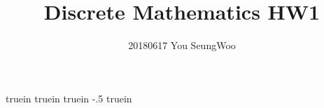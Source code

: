  truein 
 truein 
 truein 
\topmargin -.5 truein 
\textheight 8.5in
\setlength{\parindent}{10pt}
\hypersetup{
	colorlinks=true,
	linkcolor=red,
	filecolor=magenta,      
	urlcolor=cyan,
}


\title{Discrete Mathematics HW1}
\author{20180617 You SeungWoo}
